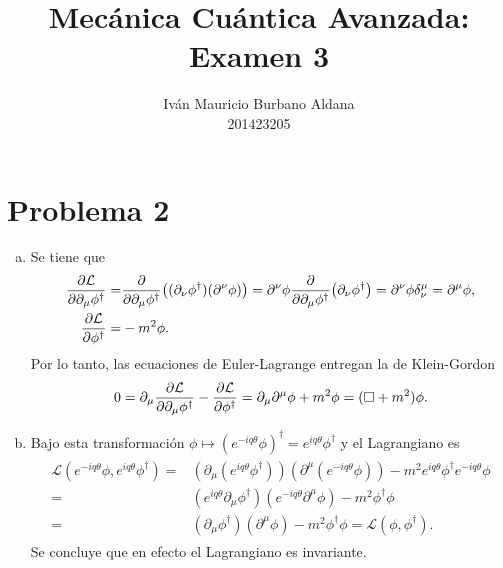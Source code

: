 \documentclass{article}
\title{Mecánica Cuántica Avanzada:\\
Examen 3}
\author{Iván Mauricio Burbano Aldana\\
201423205}
\begin{document}
\maketitle

\section*{Problema 2}

\begin{enumerate}[(a)]

\item Se tiene que
\begin{align}
\begin{split}
\pdv{\mathcal{L}}{\partial_\mu\phi^\dagger}=&\pdv{\partial_\mu\phi^\dagger}((\partial_\nu\phi^\dagger)(\partial^\nu\phi))=\partial^\nu\phi\pdv{\partial_\mu\phi^\dagger}(\partial_\nu\phi^\dagger)=\partial^\nu\phi\delta^\mu_\nu=\partial^\mu\phi,\\
\pdv{\mathcal{L}}{\phi^\dagger}=&-m^2\phi.
\end{split}
\end{align}
Por lo tanto, las ecuaciones de Euler-Lagrange entregan la de Klein-Gordon
\begin{equation}
0=\partial_\mu\pdv{\mathcal{L}}{\partial_\mu\phi^\dagger}-\pdv{\mathcal{L}}{\phi^\dagger}=\partial_\mu\partial^\mu\phi+m^2\phi=(\Box+m^2)\phi.
\end{equation}

\item Bajo esta transformación $\phi\mapsto (e^{-iq\theta}\phi)^\dagger=e^{iq\theta}\phi^\dagger$ y el Lagrangiano es
\begin{align}
\begin{split}
\mathcal{L}(e^{-iq\theta}\phi,e^{iq\theta}\phi^\dagger)=&(\partial_\mu(e^{iq\theta}\phi^\dagger))(\partial^\mu(e^{-iq\theta}\phi))-m^2e^{iq\theta}\phi^\dagger e^{-iq\theta}\phi\\
=&(e^{iq\theta}\partial_\mu\phi^\dagger)(e^{-iq\theta}\partial^\mu\phi)-m^2\phi^\dagger\phi\\
=&(\partial_\mu\phi^\dagger)(\partial^\mu\phi)-m^2\phi^\dagger\phi=\mathcal{L}(\phi,\phi^\dagger).
\end{split}
\end{align}
Se concluye que en efecto el Lagrangiano es invariante.


\end{enumerate}
\end{document}
